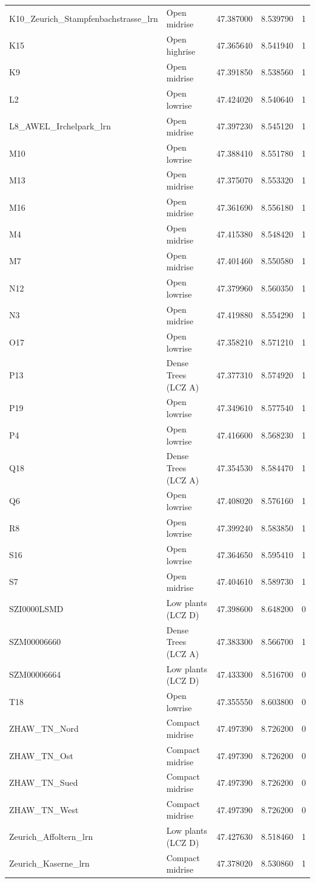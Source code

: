 \begin{tabular}{llrrr}
K10_Zeurich_Stampfenbachstrasse_lrn & Open midrise & 47.387000 & 8.539790 & 1 \\
K15 & Open highrise & 47.365640 & 8.541940 & 1 \\
K9 & Open midrise & 47.391850 & 8.538560 & 1 \\
L2 & Open lowrise & 47.424020 & 8.540640 & 1 \\
L8_AWEL_Irchelpark_lrn & Open midrise & 47.397230 & 8.545120 & 1 \\
M10 & Open lowrise & 47.388410 & 8.551780 & 1 \\
M13 & Open midrise & 47.375070 & 8.553320 & 1 \\
M16 & Open midrise & 47.361690 & 8.556180 & 1 \\
M4 & Open midrise & 47.415380 & 8.548420 & 1 \\
M7 & Open midrise & 47.401460 & 8.550580 & 1 \\
N12 & Open lowrise & 47.379960 & 8.560350 & 1 \\
N3 & Open midrise & 47.419880 & 8.554290 & 1 \\
O17 & Open lowrise & 47.358210 & 8.571210 & 1 \\
P13 & Dense Trees (LCZ A) & 47.377310 & 8.574920 & 1 \\
P19 & Open lowrise & 47.349610 & 8.577540 & 1 \\
P4 & Open lowrise & 47.416600 & 8.568230 & 1 \\
Q18 & Dense Trees (LCZ A) & 47.354530 & 8.584470 & 1 \\
Q6 & Open lowrise & 47.408020 & 8.576160 & 1 \\
R8 & Open lowrise & 47.399240 & 8.583850 & 1 \\
S16 & Open lowrise & 47.364650 & 8.595410 & 1 \\
S7 & Open midrise & 47.404610 & 8.589730 & 1 \\
SZI0000LSMD & Low plants (LCZ D) & 47.398600 & 8.648200 & 0 \\
SZM00006660 & Dense Trees (LCZ A) & 47.383300 & 8.566700 & 1 \\
SZM00006664 & Low plants (LCZ D) & 47.433300 & 8.516700 & 0 \\
T18 & Open lowrise & 47.355550 & 8.603800 & 0 \\
ZHAW_TN_Nord & Compact midrise & 47.497390 & 8.726200 & 0 \\
ZHAW_TN_Ost & Compact midrise & 47.497390 & 8.726200 & 0 \\
ZHAW_TN_Sued & Compact midrise & 47.497390 & 8.726200 & 0 \\
ZHAW_TN_West & Compact midrise & 47.497390 & 8.726200 & 0 \\
Zeurich_Affoltern_lrn & Low plants (LCZ D) & 47.427630 & 8.518460 & 1 \\
Zeurich_Kaserne_lrn & Compact midrise & 47.378020 & 8.530860 & 1 \\
\bottomrule
\end{tabular}
